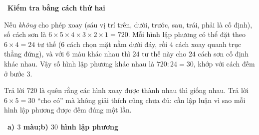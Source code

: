 \documentclass[11pt]{article}
\providecommand{\AnsWord}{Đáp số}
\newcommand{\ans}[1]{\par\smallskip{\bfseries\color{tmGreen!88!black}\AnsWord:}\ {\bfseries\color{AnsRed}#1}\par}
\newcommand{\step}[2]{\par\smallskip\noindent{\bfseries\color{tmBlue!85!black}\StepWord~#1.}\ {\bfseries #2}\par\nopagebreak}
\def\AnsWord{Đáp số}
\def\StepWord{Bước}
\begin{document}
{\step{4}{Kiểm tra bằng cách thứ hai}
Nếu \emph{không} cho phép xoay (sáu vị trí trên, dưới, trước, sau, trái, phải là cố định), số cách sơn là
$6\times5\times4\times3\times2\times1=720$. Mỗi hình lập phương có thể đặt theo $6\times4=24$ tư thế ($6$ cách chọn mặt nằm dưới
đáy, rồi $4$ cách xoay quanh trục thẳng đứng), và với $6$ màu khác nhau thì $24$ tư thế này cho $24$ cách sơn cố định khác nhau.
Vậy số hình lập phương khác nhau là $720:24=30$, khớp với cách đếm ở bước 3.
\begin{warnbox}Trả lời $720$ là quên rằng các hình xoay được thành nhau thì giống nhau. Trả lời $6\times5=30$ ``cho có'' mà không giải thích
cũng chưa đủ: cần lập luận vì sao mỗi hình lập phương được đếm đúng một lần.\end{warnbox}
\ans{a) $3$ màu;\quad b) $30$ hình lập phương}
}
\end{document}
